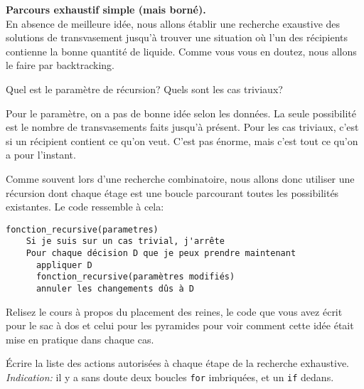 \documentclass[10pt]{article}\usepackage[nu]{esial}%
\begin{document}

\Exercice\textbf{Parcours exhaustif simple (mais borné).} \\
En absence de meilleure idée, nous allons établir une recherche exaustive des
solutions de transvasement jusqu'à trouver une situation où l'un des récipients
contienne la bonne quantité de liquide. Comme vous vous en doutez, nous allons
le faire par backtracking.

\Question Quel est le paramètre de récursion? Quels sont les cas triviaux?

\begin{Reponse}
  Pour le paramètre, on a pas de bonne idée selon les données. La seule
  possibilité est le nombre de transvasements faits jusqu'à présent. 
  Pour les cas triviaux, c'est si un récipient contient ce qu'on veut. C'est pas
  énorme, mais c'est tout ce qu'on a pour l'instant.
\end{Reponse}

\medskip Comme souvent lors d'une recherche combinatoire, nous allons donc
utiliser une récursion dont chaque étage est une boucle parcourant toutes les
possibilités existantes. Le code ressemble à cela:
\begin{Verbatim}[gobble=2]
  fonction_recursive(parametres)
    Si je suis sur un cas trivial, j'arrête
    Pour chaque décision D que je peux prendre maintenant
      appliquer D
      fonction_recursive(paramètres modifiés)
      annuler les changements dûs à D
\end{Verbatim}

\Question Relisez le cours à propos du placement des reines, le code que vous
avez écrit pour le sac à dos et celui pour les pyramides pour voir comment cette
idée était mise en pratique dans chaque cas.

\Question Écrire la liste des actions autorisées à chaque étape de la recherche
exhaustive.\\ \textit{Indication:} il y a sans doute deux boucles \texttt{for}
imbriquées, et un \texttt{if} dedans.
\end{document}

